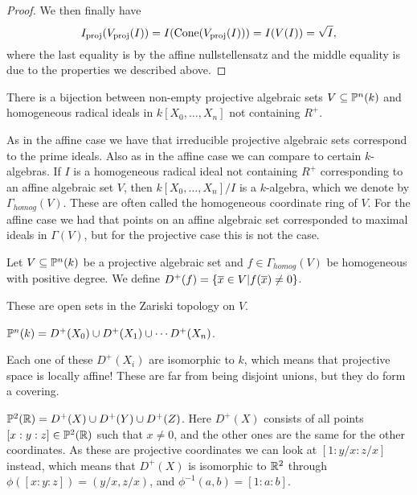 \begin{proof}
We then finally have
\begin{equation*}
    \Ip(\Vp(I))=I(\Cone(\Vp(I))) = I(V(I))=\sqrt{I},
\end{equation*}
where the last equality is by the affine nullstellensatz and the middle equality is due to the properties we described above. 
\end{proof}

\begin{proposition}
There is a bijection between non-empty projective algebraic sets $V\subseteq \P^n(k)$ and homogeneous radical ideals in $k[X_0, \ldots, X_n]$ not containing $R^+$.  
\end{proposition}

As in the affine case we have that irreducible projective algebraic sets correspond to the prime ideals. Also as in the affine case we can compare to certain $k$-algebras. If $I$ is a homogeneous radical ideal not containing $R^+$ corresponding to an affine algebraic set $V$, then $k[X_0, \ldots, X_n]/I$ is a $k$-algebra, which we denote by $\Gamma_{homog}(V)$. These are often called the homogeneous coordinate ring of $V$. For the affine case we had that points on an affine algebraic set corresponded to maximal ideals in $\Gamma(V)$, but for the projective case this is not the case. 

\begin{definition}
Let $V\subseteq \P^n(k)$ be a projective algebraic set and $f\in \Gamma_{homog}(V)$ be homogeneous with positive degree. We define $D^+(f) = \{ \x\in V\vert f(\x)\neq 0 \}$.  
\end{definition}

These are open sets in the Zariski topology on $V$. 

\begin{example}
$\P^n(k) = D^+(X_0)\cup D^+(X_1)\cup \cdots D^+(X_n)$.
\end{example}

Each one of these $D^+(X_i)$ are isomorphic to $k$, which means that projective space is locally affine! These are far from being disjoint unions, but they do form a covering. 

\begin{example}
$\P^2(\R) = D^+(X)\cup D^+(Y) \cup D^+(Z)$. Here $D^+(X)$ consists of all points $[x:y:z]\in \P^2(\R)$ such that $x\neq 0$, and the other ones are the same for the other coordinates. As these are projective coordinates we can look at $[1:y/x:z/x]$ instead, which means that $D^+(X)$ is isomorphic to $\R^2$ through $\phi([x:y:z]) = (y/x, z/x)$, and $\phi^{-1}(a,b)=[1:a:b]$. 
\end{example}


